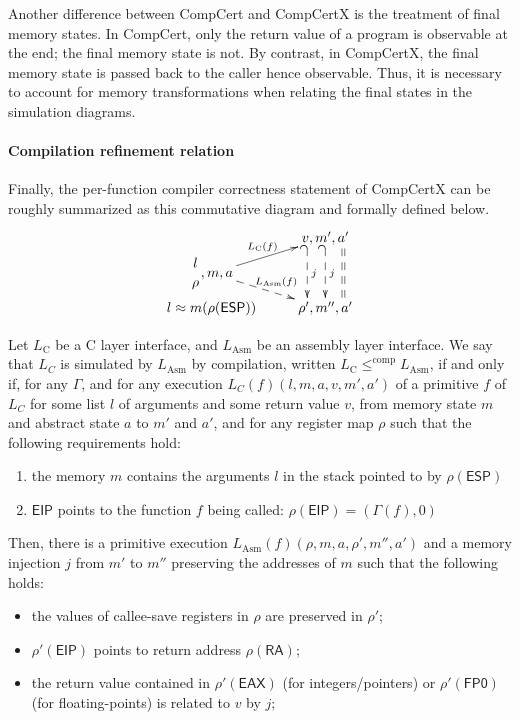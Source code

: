 Another difference between CompCert and CompCertX is the treatment of
final memory states. In CompCert, only the return value
of a program is observable at the end; the final memory state
is not. By contrast, in CompCertX, the final memory state
is passed back to the caller hence observable. Thus, it is
necessary to account for memory transformations when relating
the final states in the simulation diagrams.

\paragraph{Compilation refinement relation}
Finally, the per-function compiler correctness statement of CompCertX
can be roughly summarized as this commutative diagram and formally defined below.
\[
\xymatrix@R=3pt@C+=3pt{
& v, m', a'
\ar@<-3ex>@{_{(}-->}[dd]^j
\ar@{_{(}-->}[dd]^j
\ar@<3ex>@{==}[dd]
\\
\genfrac{}{}{0pt}{0}{l}{\rho}, m, a
\ar[ur]^{L_\text{C}(f)}
\ar@{-->}[dr]^{L_\text{Asm}(f)} \\
l \approx m(\rho(\textsf{ESP}))
& \rho', m'', a'
}
\]

\begin{definition}
Let $L_\text{C}$ be a C layer interface, and $L_{\text{Asm}}$ be an
assembly layer interface. We say that $L_C$ is simulated by
$L_{\text{Asm}}$ by compilation, written $L_{\text{C}}
\leqslant^{\textrm{comp}} L_{\text{Asm}}$, if and only if, for any $\Gamma$, and for any execution $L_C(f)(l, m, a, v, m', a')$ of a primitive $f$ of $L_C$ for some list $l$ of arguments and some return value $v$, from  memory state $m$ and abstract state $a$ to $m'$ and $a'$, and for any register map $\rho$ such that the following requirements hold:
\begin{enumerate}
\item the memory $m$ contains the arguments $l$ in the stack pointed to by $\rho(\mathsf{ESP})$
\item $\mathsf{EIP}$ points to the function $f$ being called: $\rho(\mathsf{EIP}) = (\Gamma(f), 0)$
\end{enumerate}
Then, there is a primitive execution $L_{\text{Asm}}(f)(\rho, m, a,
\rho', m'', a')$ and a memory injection $j$ from $m'$ to $m''$
preserving the addresses of $m$ such that the following holds:
\begin{itemize} %
\item the values of callee-save registers in $\rho$ are preserved in $\rho'$;
\item $\rho'(\mathsf{EIP})$ points to return address $\rho(\mathsf{RA})$;
\item the return value contained in $\rho'(\mathsf{EAX})$ (for integers/pointers) or $\rho'(\mathsf{FP0})$ (for floating-points) is related to $v$ by $j$;
\end{itemize}
\end{definition}

